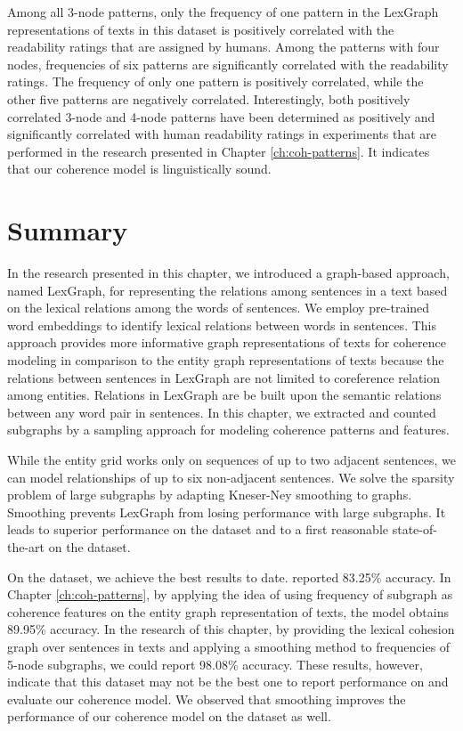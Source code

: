%
Among all 3-node patterns, only the frequency of one pattern in the LexGraph representations of texts in this dataset is positively correlated with the readability ratings that are assigned by humans.  
Among the patterns with four nodes, frequencies of six patterns are significantly correlated with the readability ratings. 
The frequency of only one pattern is positively correlated, while the other five patterns are negatively correlated. 
Interestingly, both positively correlated 3-node and 4-node patterns have been determined as positively and significantly correlated with human readability ratings in experiments that are performed in the research presented in Chapter \ref{ch:coh-patterns}.
It indicates that our coherence model is linguistically sound.  

\section{Summary}
\label{sec:lex-graph-summary}

In the research presented in this chapter, we introduced a graph-based approach, named LexGraph, for representing the relations among sentences in a text based on the lexical relations among the words of sentences. 
We employ pre-trained word embeddings to identify lexical relations between words in sentences. 
This approach provides more informative graph representations of texts for coherence modeling in comparison to the entity graph representations of texts because the relations between sentences in LexGraph are not limited to coreference relation among entities. 
Relations in LexGraph are be built upon the semantic relations between any word pair in sentences. 
In this chapter, we extracted and counted subgraphs by a sampling approach for modeling coherence patterns and features. 


While the entity grid works only on sequences of up to two adjacent sentences, we can model relationships of up to six non-adjacent sentences. 
We solve the sparsity problem of large subgraphs by adapting \mbox{Kneser-Ney} smoothing to graphs. 
Smoothing prevents LexGraph from losing performance with large subgraphs.
It leads to superior performance on the  dataset and to a first reasonable \mbox{state-of-the-art} on the  dataset.

On the \pitlerds dataset, we achieve the best results to date.  
 reported 83.25\% accuracy. 
In Chapter \ref{ch:coh-patterns}, by applying the idea of using frequency of subgraph as coherence features on the entity graph representation of texts, the model obtains 89.95\% accuracy. 
In the research of this chapter, by providing the lexical cohesion graph over sentences in texts and applying a smoothing method to frequencies of 5-node subgraphs, we could report 98.08\% accuracy. 
 These results, however, indicate that this dataset may not be the best one to report performance on and evaluate our coherence model. 
We observed that smoothing improves the performance of our coherence model on the \declercqds dataset as well. 


